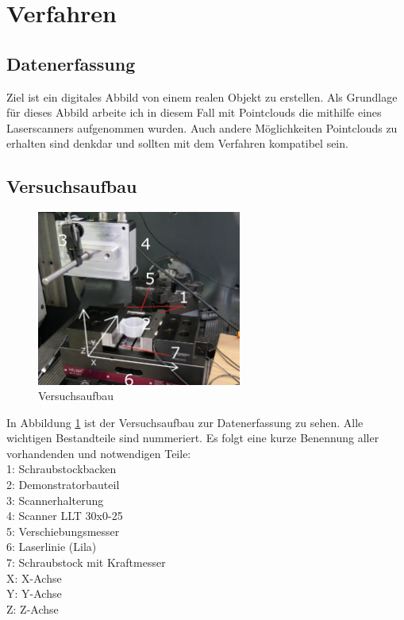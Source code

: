 \documentclass[../main.tex]{subfiles}
\begin{document}
\section{Verfahren}

\subsection{Datenerfassung}
Ziel ist ein digitales Abbild von einem realen Objekt zu erstellen.
Als Grundlage für dieses Abbild arbeite ich in diesem Fall mit Pointclouds 
die mithilfe eines Laserscanners aufgenommen wurden. Auch andere Möglichkeiten
Pointclouds zu erhalten sind denkdar und sollten mit dem Verfahren 
kompatibel sein.

\subsection{Versuchsaufbau}

\begin{figure}
    \includegraphics[width=0.6\textwidth]{images/versuchsaufbau_foto.png.JPG}
    \caption{Versuchsaufbau}
    \label{fig:versuchsaufbau}
\end{figure}

In Abbildung \ref{fig:versuchsaufbau} ist der Versuchsaufbau zur Datenerfassung 
zu sehen. Alle wichtigen Bestandteile sind nummeriert. Es folgt eine kurze Benennung
aller vorhandenden und notwendigen Teile:\\
1: Schraubstockbacken\\
2: Demonstratorbauteil\\
3: Scannerhalterung\\
4: Scanner LLT 30x0-25\\
5: Verschiebungsmesser\\
6: Laserlinie (Lila)\\
7: Schraubstock mit Kraftmesser\\
X: X-Achse\\
Y: Y-Achse\\
Z: Z-Achse\\
\end{document}
